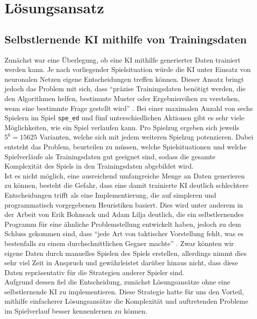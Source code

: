 \chapter{Lösungsansatz}
\label{ch:loesungsansatz}

\section{Selbstlernende KI mithilfe von Trainingsdaten}
\label{sec:selbstlernende-ki-trainingsdaten}

Zunächst war eine Überlegung, ob eine \ac{KI} mithilfe generierter Daten trainiert werden kann.
Je nach vorliegender Spielsituation würde die \ac{KI} \bspw unter Einsatz von neuronalen Netzen eigene Entscheidungen
treffen können.
Dieser Ansatz bringt jedoch das Problem mit sich, dass "`präzise Trainingsdaten benötigt werden, die den Algorithmen
helfen, bestimmte Muster oder Ergebnisreihen zu verstehen, wenn eine bestimmte Frage gestellt wird"'
.
Bei einer maximalen Anzahl von sechs Spielern im Spiel \texttt{spe\_ed} und fünf unterschiedlichen Aktionen gibt
es sehr viele Möglichkeiten, wie ein Spiel verlaufen kann.
Pro Spielzug ergeben sich jeweils $5^6 = 15625$ Varianten, welche sich mit jedem weiteren Spielzug potenzieren.
Dabei entsteht das Problem, beurteilen zu müssen, welche Spielsituationen und welche Spielverläufe als Trainingsdaten
gut geeignet sind, sodass die gesamte Komplexität des Spiels in den Trainingsdaten abgebildet wird. \\

Ist es nicht möglich, eine ausreichend umfangreiche Menge an Daten generieren zu können, besteht die Gefahr, dass eine
damit trainierte \ac{KI} deutlich schlechtere Entscheidungen trifft als eine Implementierung, die auf simpleren und
programmatisch vorgegebenen Heuristiken basiert.
Dies wird unter anderem in der Arbeit von Erik Bohnsack und Adam Lilja deutlich, die ein selbstlernendes Programm für
eine ähnliche Problemstellung entwickelt haben, jedoch zu dem Schluss gekommen sind, dass "`jede Art von taktischer
Vorstellung fehlt, was es bestenfalls zu einem durchschnittlichen Gegner machte"' .
Zwar könnten wir eigene Daten durch manuelles Spielen des Spiels erstellen, allerdings nimmt dies sehr viel Zeit in
Anspruch und gewährleistet darüber hinaus nicht, dass diese Daten repräsentativ für die Strategien anderer Spieler
sind. \\

Aufgrund dessen fiel die Entscheidung, zunächst Lösungsansätze ohne eine selbstlernende \ac{KI} zu implementieren.
Diese Strategie hatte für uns den Vorteil, mithilfe einfacherer Lösungsansätze die Komplexität und auftretenden Probleme
im Spielverlauf besser kennenlernen zu können.

